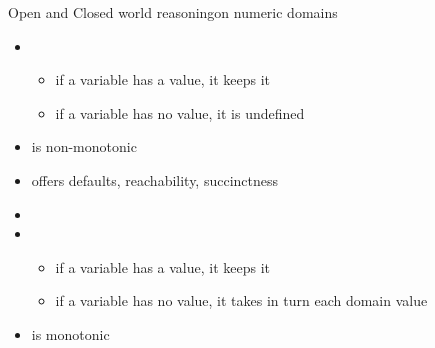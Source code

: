 \begin{frame}{Open and Closed world reasoning}{on numeric domains}
  \bigskip
  \begin{itemize}
  \item<1-> 
    \begin{itemize}
    \item if a variable has a value,  it keeps it
    \item if a variable has no value, it is undefined
    \end{itemize}
  \item<only@3->[] is non-monotonic
  \item<only@4->[] offers defaults, reachability, succinctness
  \item<only@1-3>[]
  \item<2-> 
    \begin{itemize}
    \item if a variable has a value,  it keeps it
    \item if a variable has no value, it takes in turn each domain value
    \end{itemize}
  \item<only@3->[] is monotonic
  \end{itemize}
\end{frame}
%

